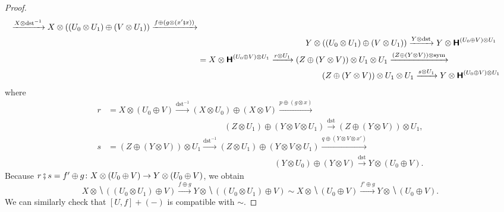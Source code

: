 \begin{proof}
\begin{align*}
      \xrightarrow{X \otimes \mathrm{dst}^{-1}}
      X \otimes ((U_{0} \otimes U_{1}) \oplus (V \otimes U_{1}))
      \xrightarrow{f \oplus (g \otimes (x' \fatsemi x))} \\
    &\hspace{13em}
      Y \otimes ((U_{0} \otimes U_{1}) \oplus (V \otimes U_{1}))
      \xrightarrow{Y \otimes \mathrm{dst}}
      Y \otimes \hide{(U_{0} \oplus V) \otimes U_{1}} \\
    &= X \otimes \hide{(U_{0} \oplus V) \otimes U_{1}}
      \xrightarrow{r \otimes U_{1}}
      (Z \oplus (Y \otimes V)) \otimes U_{1} \otimes U_{1}
      \xrightarrow{(Z \oplus (Y \otimes V)) \otimes \mathrm{sym}} \\
    &\hspace{15em}
      (Z \oplus (Y \otimes V)) \otimes U_{1} \otimes U_{1}
      \xrightarrow{s \otimes U_{1}}
      Y \otimes \hide{(U_{0} \oplus V) \otimes U_{1}}
  \end{align*}
  where
  \begin{align*}
    r &= X \otimes (U_{0} \oplus V)
        \xrightarrow{\mathrm{dst}^{-1}}
        (X \otimes U_{0}) \oplus (X \otimes V)
        \xrightarrow{p \oplus (g \otimes x)} \\
      & \hspace{14em}
        (Z \otimes U_{1}) \oplus (Y \otimes V \otimes U_{1})
        \xrightarrow{\mathrm{dst}}
        (Z \oplus (Y \otimes V)) \otimes U_{1}, \\
    s &= (Z \oplus (Y \otimes V)) \otimes U_{1}
        \xrightarrow{\mathrm{dst}^{-1}}
        (Z \otimes U_{1}) \oplus (Y \otimes V \otimes U_{1})
        \xrightarrow{q \oplus (Y \otimes V \otimes x')} \\
      &\hspace{20em}
        (Y \otimes U_{0}) \oplus (Y \otimes V)
        \xrightarrow{\mathrm{dst}}
        Y \otimes (U_{0} \oplus V).
  \end{align*}
  Because $r \fatsemi s = f' \oplus g \colon X \otimes (U_{0} \oplus V)
  \to Y \otimes (U_{0} \oplus V)$, we obtain
  \begin{equation*}
    X \otimes \hide{((U_{0} \otimes U_{1}) \oplus V)}
    \xrightarrow{f \oplus g}
    Y \otimes \hide{((U_{0} \otimes U_{1}) \oplus V)}
    \sim
    X \otimes \hide{(U_{0} \oplus V)}
    \xrightarrow{f' \oplus g}
    Y \otimes \hide{(U_{0} \oplus V)}.
  \end{equation*}
  We can similarly check that $[U,f] + (-)$ is compatible with
  $\sim$.
\end{proof}

